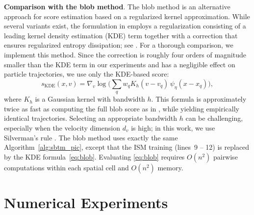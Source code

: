 \documentclass[]{article}
\numberwithin{equation}{section}
\begin{document}
{\bf Comparison with the blob method}. 
The blob method 
\citep{carrillo2019blob, carrillo2020particle, bailo2024collisional} is an alternative approach for score estimation based on a regularized kernel approximation. While several variants exist, the formulation in \citep{bailo2024collisional} employs a regularization   consisting of a leading kernel density estimation (KDE) term together with a correction that ensures regularized entropy dissipation; see \citep[Eq. (2.25)]{bailo2024collisional}. For a thorough comparison, we implement this method. Since the correction is roughly four orders of magnitude smaller than the KDE term in our experiments and has a negligible effect on particle trajectories, we use only the KDE-based score:
\begin{equation}
\label{eq:blob}
s_{\text{KDE}}(x, v) = \nabla_v \log \bigg( \sum_{q} w_q K_h(v - v_q) \, \psi_\eta(x - x_q) \bigg),
\end{equation}
where $K_h$ is a Gaussian kernel with bandwidth $h$. This formula is approximately twice as fast as computing the full blob score as in \citep{bailo2024collisional}, while yielding empirically identical trajectories. Selecting an appropriate bandwidth $h$ can be challenging, especially when the velocity dimension $d_v$ is high; in this work, we use Silverman's rule \citep{silverman2018density}. The blob method uses exactly the same Algorithm~\ref{alg:sbtm_pic}, except that the ISM training (lines~9 -- 12) is replaced by the KDE formula~\eqref{eq:blob}. Evaluating \eqref{eq:blob} requires $O(n^2)$ pairwise computations within each spatial cell and $O(n^2)$ memory. 



\section{Numerical Experiments}
\label{sec:experiments}

\end{document}
